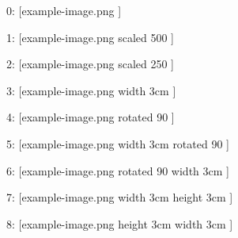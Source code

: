 \documentclass{article}
\begin{document}
0: [\XeTeXpicfile example-image.png ]

1: [\XeTeXpicfile example-image.png  scaled 500 ]

2: [\XeTeXpicfile example-image.png  scaled 250 ]


\clearpage

3: [\XeTeXpicfile example-image.png  width 3cm ]


4: [\XeTeXpicfile example-image.png  rotated 90 ]

\clearpage

5: [\XeTeXpicfile example-image.png  width 3cm rotated 90 ]

6: [\XeTeXpicfile example-image.png  rotated 90 width 3cm ]

\clearpage

7: [\XeTeXpicfile example-image.png  width 3cm height 3cm ]

8: [\XeTeXpicfile example-image.png  height 3cm width 3cm ]
\end{document}
